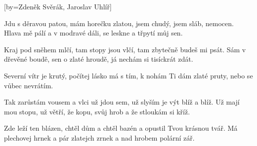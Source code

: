 [by={Zdeněk Svěrák, Jaroslav Uhlíř}]

\beginverse{}
Jdu s děravou patou, mám horečku zlatou,
jsem chudý, jsem sláb, nemocen.
Hlava mě pálí a v modravé dáli,
se leskne a třpytí můj sen.
\endverse{}

\beginverse{}
Kraj pod sněhem mlčí, tam stopy jsou vlčí,
tam zbytečně budeš mi psát.
Sám v dřevěné boudě, sen o zlaté hroudě,
já nechám si tisíckrát zdát. 
\endverse{}

\beginchorus{}
Severní vítr je krutý, počítej lásko má s tím,
k nohám Ti dám zlaté pruty, nebo se vůbec nevrátím.
\endchorus{}

\beginverse{}
Tak zarůstám vousem a vlci už jdou sem,
už slyším je výt blíž a blíž.
Už mají mou stopu, už větří, že kopu,
svůj hrob a že stloukám si kříž.
\endverse{}

\beginverse{}
Zde leží ten blázen, chtěl dům a chtěl bazén
a opustil Tvou krásnou tvář.
Má plechovej hrnek a pár zlatejch zrnek
a nad hrobem polární zář.
\endverse{}

\beginchorus{}
\phantom{}
\endchorus{}

\endsong{}
